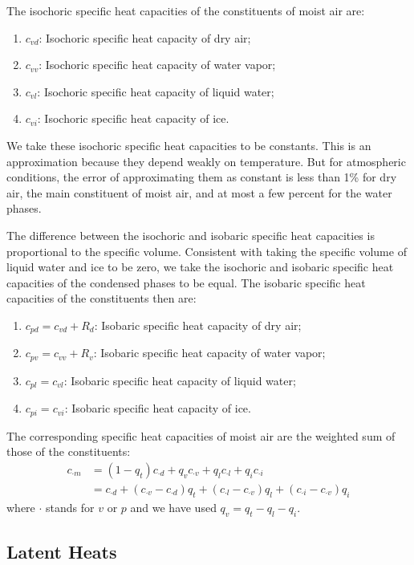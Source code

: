 \documentclass{article}
\begin{document}
The isochoric specific heat capacities of the constituents of moist air are:
\begin{enumerate}
    \item $c_{vd}$: Isochoric specific heat capacity of dry air;
    \item $c_{vv}$: Isochoric specific heat capacity of water vapor;
    \item $c_{vl}$: Isochoric specific heat capacity of liquid water;
    \item $c_{vi}$: Isochoric specific heat capacity of ice.
\end{enumerate}
We take these isochoric specific heat capacities to be constants. This is an approximation because they depend weakly on temperature. But for atmospheric conditions, the error of approximating them as constant is less than 1\% for dry air, the main constituent of moist air, and at most a few percent for the water phases.

The difference between the isochoric and isobaric specific heat capacities is proportional to the specific volume. Consistent with taking the specific volume of liquid water and ice to be zero, we take the isochoric and isobaric specific heat capacities of the condensed phases to be equal. The isobaric specific heat capacities of the constituents then are:
\begin{enumerate}
    \item $c_{pd} = c_{vd} + R_d$: Isobaric specific heat capacity of dry air;
    \item $c_{pv} = c_{vv} + R_v$: Isobaric specific heat capacity of water vapor;
    \item $c_{pl} = c_{vl}$: Isobaric specific heat capacity of liquid water;
    \item $c_{pi} = c_{vi}$: Isobaric specific heat capacity of ice.
\end{enumerate}

The corresponding specific heat capacities of moist air are the weighted sum of those of the constituents:
\begin{align}
    c_{\cdot m} & = (1-q_t) c_{\cdot d} + q_v c_{\cdot v} + q_l c_{\cdot l} + q_i c_{\cdot i}\\
    & = c_{\cdot d} + (c_{\cdot v} - c_{\cdot d})q_t + (c_{\cdot l} - c_{\cdot v})q_l + (c_{\cdot i} - c_{\cdot v})q_i
\end{align}
where $\cdot$ stands for $v$ or $p$ and we have used $q_v = q_t -q_l - q_i$.

\subsection{Latent Heats}
\end{document}

